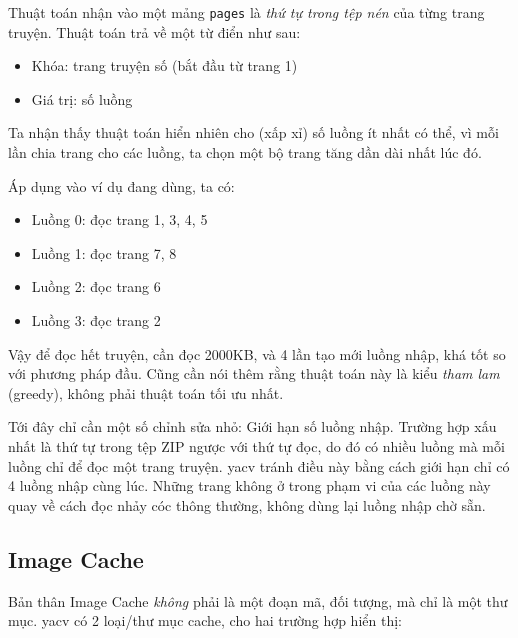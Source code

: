 \documentclass[../../../../thesis]{subfiles}
\begin{document}
Thuật toán nhận vào một mảng \texttt{pages} là \emph{thứ tự trong tệp nén} của
từng trang truyện. Thuật toán trả về một từ điển như sau:

\begin{itemize}
    \item
        Khóa: trang truyện số (bắt đầu từ trang 1)
    \item
        Giá trị: số luồng
\end{itemize}

Ta nhận thấy thuật toán hiển nhiên cho (xấp xỉ) số luồng ít nhất có thể, vì mỗi
lần chia trang cho các luồng, ta chọn một bộ trang tăng dần dài nhất lúc đó.

Áp dụng vào ví dụ đang dùng, ta có:

\begin{itemize}
    \item
        Luồng 0: đọc trang 1, 3, 4, 5
    \item
        Luồng 1: đọc trang 7, 8
    \item
        Luồng 2: đọc trang 6
    \item
        Luồng 3: đọc trang 2
\end{itemize}

Vậy để đọc hết truyện, cần đọc 2000KB, và 4 lần tạo mới luồng nhập, khá tốt so
với phương pháp đầu. Cũng cần nói thêm rằng thuật toán này là kiểu \emph{tham
lam} (greedy), không phải thuật toán tối ưu nhất.

Tới đây chỉ cần một số chỉnh sửa nhỏ: Giới hạn số luồng nhập. Trường hợp xấu
nhất là thứ tự trong tệp ZIP ngược với thứ tự đọc, do đó có nhiều luồng mà mỗi
luồng chỉ để đọc một trang truyện. yacv tránh điều này bằng cách giới hạn chỉ có
4 luồng nhập cùng lúc. Những trang không ở trong phạm vi của các luồng này quay
về cách đọc nhảy cóc thông thường, không dùng lại luồng nhập chờ sẵn.



\subsection{Image Cache}\label{sec:image-cache}

Bản thân Image Cache \emph{không} phải là một đoạn mã, đối tượng, mà chỉ là một
thư mục. yacv có 2 loại/thư mục cache, cho hai trường hợp hiển thị:
\end{document}
